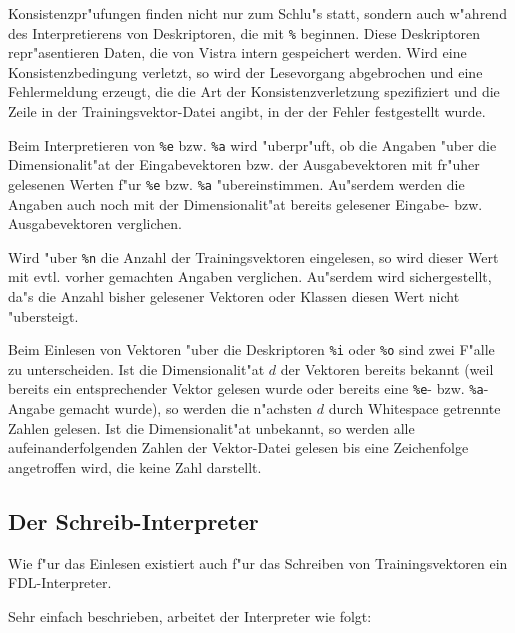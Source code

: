 Konsistenzpr"ufungen finden nicht nur zum Schlu"s statt, sondern 
auch w"ahrend des Interpretierens von Deskriptoren, die mit {\tt \%} beginnen.
Diese Deskriptoren repr"asentieren Daten, die von Vistra intern gespeichert
werden.
Wird eine Konsistenzbedingung verletzt, so wird der Lesevorgang abgebrochen
und eine Fehlermeldung erzeugt, die die Art der Konsistenzverletzung
spezifiziert und die Zeile in der Trainingsvektor-Datei angibt, in der
der Fehler festgestellt wurde. 

Beim Interpretieren von {\tt \%e} bzw. {\tt \%a} wird "uberpr"uft, ob die
Angaben "uber die Dimensionalit"at der Eingabevektoren bzw. der Ausgabevektoren
mit fr"uher gelesenen Werten f"ur {\tt \%e} bzw. {\tt \%a} "ubereinstimmen.
Au"serdem werden die Angaben auch noch mit der Dimensionalit"at bereits
gelesener Eingabe- bzw. Ausgabevektoren verglichen.

Wird "uber {\tt \%n} die Anzahl der Trainingsvektoren eingelesen, so
wird dieser Wert mit evtl. vorher gemachten Angaben verglichen.
Au"serdem wird sichergestellt, da"s die Anzahl bisher gelesener 
Vektoren oder Klassen diesen Wert nicht "ubersteigt.

Beim Einlesen von Vektoren "uber die Deskriptoren {\tt \%i} oder {\tt \%o}
sind zwei F"alle zu unterscheiden.
Ist die Dimensionalit"at $d$ der Vektoren bereits bekannt (weil 
bereits ein entsprechender Vektor gelesen wurde oder bereits eine
{\tt \%e}- bzw. {\tt \%a}-Angabe gemacht wurde), so werden die n"achsten $d$
durch Whitespace getrennte Zahlen gelesen.
Ist die Dimensionalit"at unbekannt, so werden alle aufeinanderfolgenden
Zahlen der Vektor-Datei gelesen bis eine Zeichenfolge angetroffen wird,
die keine Zahl darstellt.  

\subsection{Der Schreib-Interpreter} 

Wie f"ur das Einlesen existiert auch f"ur das Schreiben von Trainingsvektoren
ein FDL-Interpreter.

Sehr einfach beschrieben, arbeitet der Interpreter wie folgt:

